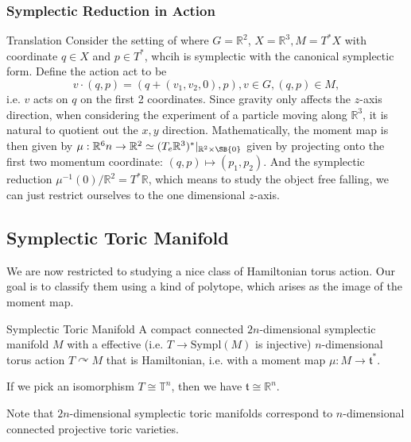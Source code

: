 \documentclass[b5paper,final]{article}
\newcommand{\Sympl}{\mathrm{Sympl}}
\newcommand{\acton}{\curvearrowright}
\begin{document}
\subsubsection*{Symplectic Reduction in Action}

\begin{example}[exp:]{Translation}
  Consider the setting of  where $G=\mathbb{R}^2$, $X=\mathbb{R}^{3}, M=T^*X$ with coordinate $q\in X$ and $p\in T^*$, whcih is symplectic with the canonical symplectic form. Define the action act to be
  \[
    v\cdot (q,p)=(q+(v_1,v_2,0),p), v\in G, (q,p)\in M,
  \]
  i.e. $v$ acts on $q$ on the first 2 coordinates. Since gravity only affects the $z$-axis direction, when considering the experiment of a particle moving along $\mathbb{R}^3$, it is natural to quotient out the $x,y$ direction. Mathematically, the moment map is then given by $\mu:\mathbb{R}^6n\rightarrow \mathbb{R}^2\simeq (T_e\mathbb{R}^3)^*|_{\mathbb{R}^2\times \SB{0}}$ given by projecting onto the first two momentum coordinate: $(q,p)\mapsto (p_1,p_2)$. And the symplectic reduction $\mu^{-1}(0)/\mathbb{R}^2=T^*\mathbb{R}$, which means to study the object free falling, we can just restrict ourselves to the one dimensional $z$-axis.
\end{example}
%

\subsection{Symplectic Toric Manifold}

We are now restricted to studying a nice class of Hamiltonian torus action. Our goal is to classify them using a kind of polytope, which arises as the image of the moment map.

\begin{definition}{Symplectic Toric Manifold}
    A compact connected $2n$-dimensional symplectic manifold $M$ with a effective (i.e. $T \to \Sympl(M)$ is injective) $n$-dimensional torus action $T \acton M$ that is Hamiltonian, i.e. with a moment map $\mu : M \to \mathfrak{t}^*$.
    \begin{remark}
        If we pick an isomorphism $T \cong \mathbb{T}^n$, then we have $\mathfrak{t} \cong \mathbb{R}^n$.
    \end{remark}
    \begin{remark}
        Note that $2n$-dimensional symplectic toric manifolds correspond to $n$-dimensional connected projective toric varieties.
    \end{remark}
\end{definition}
\end{document}
